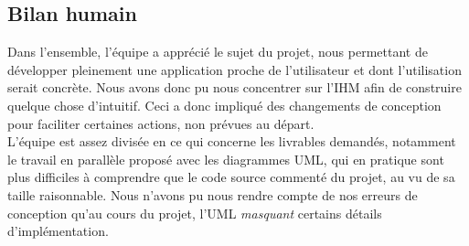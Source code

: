 \documentclass[a4paper]{report}
\begin{document}
\subsection{Bilan humain}

Dans l'ensemble, l'équipe a apprécié le sujet du projet, nous permettant de
développer pleinement une application proche de l'utilisateur et dont
l'utilisation serait concrète. Nous avons donc pu nous concentrer sur
l'IHM afin de construire quelque chose d'intuitif. Ceci a donc impliqué des
changements de conception pour faciliter certaines actions, non prévues au
départ. \\

L'équipe est assez divisée en ce qui concerne les livrables demandés, notamment
le travail en parallèle proposé avec les diagrammes UML, qui en pratique sont
plus difficiles à comprendre que le code source commenté du projet, au vu de sa
taille raisonnable. Nous n'avons pu nous rendre compte de nos erreurs de
conception qu'au cours du projet, l'UML \emph{masquant} certains détails
d'implémentation.
\end{document}
